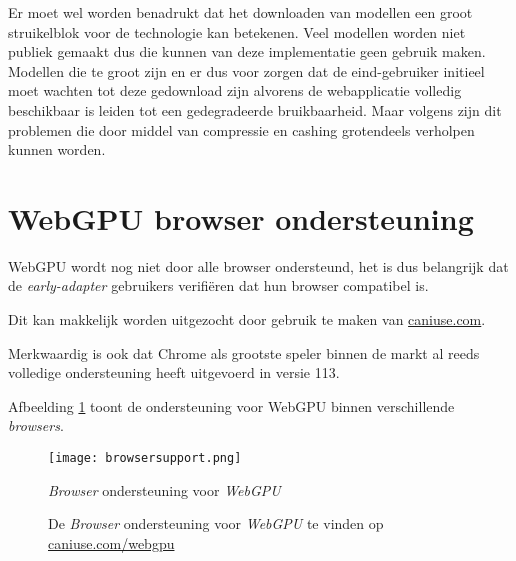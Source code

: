 \bigbreak{}

Er moet wel worden benadrukt dat het downloaden van modellen een groot struikelblok voor de technologie kan betekenen. Veel modellen worden niet publiek gemaakt dus die kunnen van deze implementatie geen gebruik maken. Modellen die te groot zijn en er dus voor zorgen dat de eind-gebruiker initieel moet wachten tot deze gedownload zijn alvorens de webapplicatie volledig beschikbaar is leiden tot een gedegradeerde bruikbaarheid. Maar volgens \textcite{Fleetwood2022} zijn dit problemen die door middel van compressie en cashing grotendeels verholpen kunnen worden.

\section{WebGPU browser ondersteuning}

WebGPU wordt nog niet door alle browser ondersteund, het is dus belangrijk dat de \textit{early-adapter} gebruikers verifiëren dat hun browser compatibel is.

Dit kan makkelijk worden uitgezocht door gebruik te maken van \href{https://caniuse.com/webgpu}{caniuse.com}.

Merkwaardig is ook dat Chrome als grootste speler binnen de markt al reeds volledige ondersteuning heeft uitgevoerd in versie 113. \autocite{Deveria2024}

\bigbreak{}

Afbeelding \ref{fig:Browser Support} toont de ondersteuning voor WebGPU binnen verschillende \textit{browsers}.

\begin{figure}
    \texttt{[image: browsersupport.png]}
    \caption{
        De \textit{Browser} ondersteuning voor \textit{WebGPU} te vinden op \href{https://caniuse.com/webgpu}{caniuse.com/webgpu}
        }{
            \textit{Browser} ondersteuning voor \textit{WebGPU}
        }
    \label{fig:Browser Support}
\end{figure}